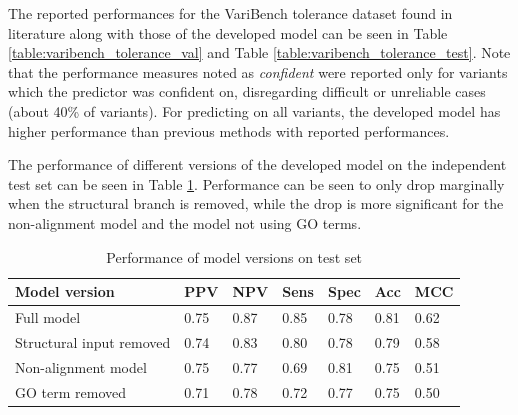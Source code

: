 \documentclass[11pt]{article}
\begin{document}
The reported performances for the VariBench tolerance dataset found in literature\cite{niroula2015pon} along with those of the developed model can be seen in Table \ref{table:varibench_tolerance_val} and Table \ref{table:varibench_tolerance_test}. Note that the performance measures noted as \textit{confident} were reported only for variants which the predictor was confident on, disregarding difficult or unreliable cases (about 40\% of variants\cite{niroula2015pon}). For predicting on all variants, the developed model has higher performance than previous methods with reported performances.

The performance of different versions of the developed model on the independent test set can be seen in Table \ref{table:model_versions}. Performance can be seen to only drop marginally when the structural branch is removed, while the drop is more significant for the non-alignment model and the model not using GO terms.

\begin{table}
\caption{Performance of model versions on test set}
\label{table:model_versions}
\begin{center}
\begin{tabular}{lllllll}
\toprule
Model version & PPV & NPV & Sens & Spec & Acc & MCC\\ 
\midrule
Full model & 0.75 & 0.87 & 0.85 & 0.78 & 0.81 & 0.62   \\
Structural input removed & 0.74 & 0.83 & 0.80 & 0.78 & 0.79 & 0.58  \\ 
Non-alignment model & 0.75 & 0.77 & 0.69 & 0.81 & 0.75 & 0.51   \\
GO term removed & 0.71 & 0.78 & 0.72 & 0.77 & 0.75 & 0.50  \\ 
\bottomrule
\end{tabular}
\end{center}
\end{table}
\end{document}
